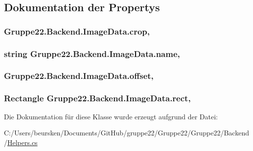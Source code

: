 \subsection{Dokumentation der Propertys}
\hypertarget{class_gruppe22_1_1_backend_1_1_image_data_a8733f1a02de87502a6fef2453b435f64}{
\subsubsection[{crop}]{ Gruppe22.\-Backend.\-Image\-Data.\-crop\hspace{0.3cm}{\ttfamily [get]}, {\ttfamily [set]}}}\label{class_gruppe22_1_1_backend_1_1_image_data_a8733f1a02de87502a6fef2453b435f64}
\hypertarget{class_gruppe22_1_1_backend_1_1_image_data_aaa0851a204433a44a73e5dd7ed175538}{
\subsubsection[{name}]{\setlength{\rightskip}{0pt plus 5cm}string Gruppe22.\-Backend.\-Image\-Data.\-name\hspace{0.3cm}{\ttfamily [get]}, {\ttfamily [set]}}}\label{class_gruppe22_1_1_backend_1_1_image_data_aaa0851a204433a44a73e5dd7ed175538}
\hypertarget{class_gruppe22_1_1_backend_1_1_image_data_a5fd4e2478cb4b225d30ae74fe08e77b3}{
\subsubsection[{offset}]{ Gruppe22.\-Backend.\-Image\-Data.\-offset\hspace{0.3cm}{\ttfamily [get]}, {\ttfamily [set]}}}\label{class_gruppe22_1_1_backend_1_1_image_data_a5fd4e2478cb4b225d30ae74fe08e77b3}
\hypertarget{class_gruppe22_1_1_backend_1_1_image_data_a75fd8821ff6ae1e7febb0489b0ae8104}{
\subsubsection[{rect}]{\setlength{\rightskip}{0pt plus 5cm}Rectangle Gruppe22.\-Backend.\-Image\-Data.\-rect\hspace{0.3cm}{\ttfamily [get]}, {\ttfamily [set]}}}\label{class_gruppe22_1_1_backend_1_1_image_data_a75fd8821ff6ae1e7febb0489b0ae8104}


Die Dokumentation für diese Klasse wurde erzeugt aufgrund der Datei\-:\begin{DoxyCompactItemize}
\item 
C\-:/\-Users/beursken/\-Documents/\-Git\-Hub/gruppe22/\-Gruppe22/\-Gruppe22/\-Backend/\hyperlink{_helpers_8cs}{Helpers.\-cs}\end{DoxyCompactItemize}
